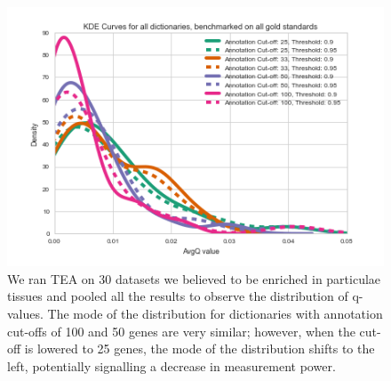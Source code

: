 \documentclass[linenumbers, doublespacing]{bmcart}
\begin{document}
\begin{backmatter}
\begin{figure}[h!]
	\includegraphics[width=\textwidth]{avgQKDE_method=any.png}
  \captionsetup{width= 0.95\textwidth}
  \caption{
      We ran TEA on 30 datasets we believed to be enriched in particulae tissues and pooled all the results to observe the distribution of q-values. The mode of the distribution for dictionaries with annotation cut-offs of 100 and 50 genes are very similar; however, when the cut-off is lowered to 25 genes, the mode of the distribution shifts to the left, potentially signalling a decrease in measurement power.}
	  \label{fig:qvals}
\end{figure}


\end{backmatter}
\end{document}
